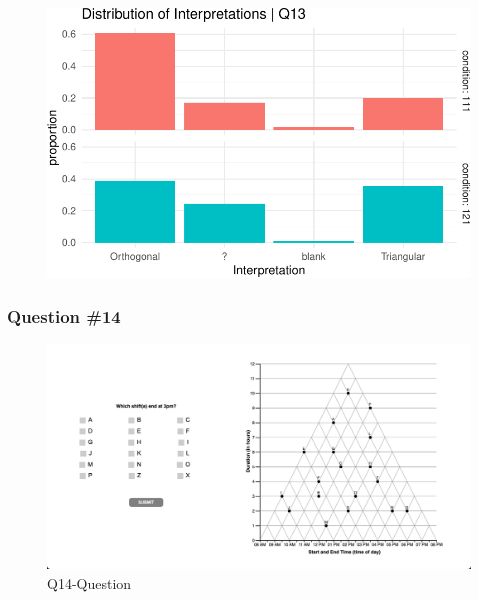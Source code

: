 \documentclass[
  letterpaper,
  DIV=11,
  numbers=noendperiod]{scrreprt}
\begin{document}
\begin{figure}[H]

{\centering \includegraphics{analysis/SGC3A/2_sgc3A_scoring_files/figure-pdf/Q13-distribution-2.pdf}

}

\end{figure}

\hypertarget{question-14}{%
\subsubsection{Question \#14}\label{question-14}}

\begin{figure}

{\centering \includegraphics{analysis/SGC3A/static/questions/Q14.png}

}

\caption{\label{fig-Q14}Q14-Question}

\end{figure}
\end{document}
